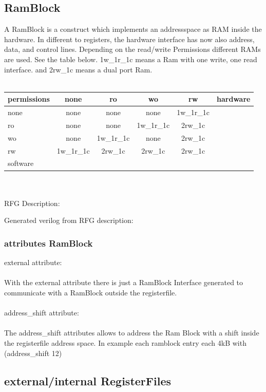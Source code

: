 \documentclass[12pt,a4paper]{article}
\begin{document}
\subsection{RamBlock}
A RamBlock is a construct which implements an addressspace as RAM inside the hardware. In different to registers, the hardware interface has now also address, data, and control lines. Depending on the read/write Permissions different RAMs are used. See the table below. 1w\_1r\_1c means a Ram with one write, one read interface. and 2rw\_1c means a dual port Ram.\\
\\
\begin{tabular}{ l || c | c | c | c | r }
    permissions & none & ro & wo & rw & hardware\\ \hline\hline
    none & none & none & none & 1w\_1r\_1c \\ \cline{1-5}
    ro & none & none & 1w\_1r\_1c& 2rw\_1c\\ \cline{1-5}
    wo & none & 1w\_1r\_1c& none & 2rw\_1c\\ \cline{1-5}
    rw & 1w\_1r\_1c& 2rw\_1c& 2rw\_1c & 2rw\_1c\\ \cline{1-5}
    software \\
\end{tabular}
\\
\\
RFG Description:
 
\newpage
Generated verilog from RFG description:

\newpage
\subsubsection{attributes RamBlock}
external attribute:\\
\\
With the external attribute there is just a RamBlock Interface generated to communicate with a RamBlock outside the registerfile.\\
\\
address\_shift attribute:\\
\\
The address\_shift attributes allows to address the Ram Block with a shift inside the registerfile address space. In example each ramblock entry each 4kB with (address\_shift 12)
\newpage
\subsection{external/internal RegisterFiles}
\end{document}
